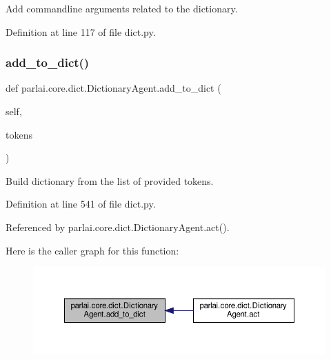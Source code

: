 \begin{DoxyVerb}Add commandline arguments related to the dictionary.\end{DoxyVerb}
 

Definition at line 117 of file dict.\+py.

\mbox{\label{classparlai_1_1core_1_1dict_1_1DictionaryAgent_acb28700c8c2725c05a8f3e28f11f8714}} 
\subsubsection{\texorpdfstring{add\+\_\+to\+\_\+dict()}{add\_to\_dict()}}
{\footnotesize\ttfamily def parlai.\+core.\+dict.\+Dictionary\+Agent.\+add\+\_\+to\+\_\+dict (\begin{DoxyParamCaption}\item[{}]{self,  }\item[{}]{tokens }\end{DoxyParamCaption})}

\begin{DoxyVerb}Build dictionary from the list of provided tokens.\end{DoxyVerb}
 

Definition at line 541 of file dict.\+py.



Referenced by parlai.\+core.\+dict.\+Dictionary\+Agent.\+act().

Here is the caller graph for this function\+:
\nopagebreak
\begin{figure}[H]
\begin{center}
\leavevmode
\includegraphics[width=350pt]{classparlai_1_1core_1_1dict_1_1DictionaryAgent_acb28700c8c2725c05a8f3e28f11f8714_icgraph}
\end{center}
\end{figure}
\mbox{\label{classparlai_1_1core_1_1dict_1_1DictionaryAgent_aec44508e4b501214618e24d86a4a51df}} 
